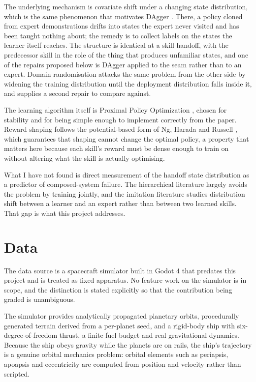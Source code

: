\documentclass[11pt]{article}
\begin{document}
The underlying mechanism is covariate shift under a changing state distribution,
which is the same phenomenon that motivates DAgger \cite{ross2011}. There, a policy
cloned from expert demonstrations drifts into states the expert never visited and has
been taught nothing about; the remedy is to collect labels on the states the learner
itself reaches. The structure is identical at a skill handoff, with the predecessor
skill in the role of the thing that produces unfamiliar states, and one of the repairs
proposed below is DAgger applied to the seam rather than to an expert. Domain
randomisation \cite{tobin2017} attacks the same problem from the other side by
widening the training distribution until the deployment distribution falls inside it,
and supplies a second repair to compare against.

The learning algorithm itself is Proximal Policy Optimization \cite{schulman2017},
chosen for stability and for being simple enough to implement correctly from the
paper. Reward shaping follows the potential-based form of Ng, Harada and Russell
\cite{ng1999}, which guarantees that shaping cannot change the optimal policy, a
property that matters here because each skill's reward must be dense enough to train
on without altering what the skill is actually optimising.

What I have not found is direct measurement of the handoff state distribution as a
predictor of composed-system failure. The hierarchical literature largely avoids the
problem by training jointly, and the imitation literature studies distribution shift
between a learner and an expert rather than between two learned skills. That gap is
what this project addresses.

\section{Data}

The data source is a spacecraft simulator built in Godot 4 that predates this project
and is treated as fixed apparatus. No feature work on the simulator is in scope, and
the distinction is stated explicitly so that the contribution being graded is
unambiguous.

The simulator provides analytically propagated planetary orbits, procedurally
generated terrain derived from a per-planet seed, and a rigid-body ship with
six-degree-of-freedom thrust, a finite fuel budget and real gravitational dynamics.
Because the ship obeys gravity while the planets are on rails, the ship's trajectory
is a genuine orbital mechanics problem: orbital elements such as periapsis, apoapsis
and eccentricity are computed from position and velocity rather than scripted.
\end{document}
